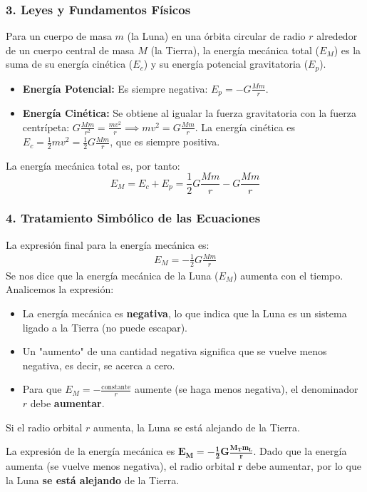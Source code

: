 \subsubsection*{3. Leyes y Fundamentos Físicos}
Para un cuerpo de masa $m$ (la Luna) en una órbita circular de radio $r$ alrededor de un cuerpo central de masa $M$ (la Tierra), la energía mecánica total ($E_M$) es la suma de su energía cinética ($E_c$) y su energía potencial gravitatoria ($E_p$).
\begin{itemize}
    \item \textbf{Energía Potencial:} Es siempre negativa: $E_p = -G\frac{Mm}{r}$.
    \item \textbf{Energía Cinética:} Se obtiene al igualar la fuerza gravitatoria con la fuerza centrípeta:
    $G\frac{Mm}{r^2} = \frac{mv^2}{r} \implies mv^2=G\frac{Mm}{r}$.
    La energía cinética es $E_c = \frac{1}{2}mv^2 = \frac{1}{2}G\frac{Mm}{r}$, que es siempre positiva.
\end{itemize}
La energía mecánica total es, por tanto:
$$ E_M = E_c + E_p = \frac{1}{2}G\frac{Mm}{r} - G\frac{Mm}{r} $$

\subsubsection*{4. Tratamiento Simbólico de las Ecuaciones}
La expresión final para la energía mecánica es:
\begin{gather}
    E_M = -\frac{1}{2}G\frac{Mm}{r}
\end{gather}
Se nos dice que la energía mecánica de la Luna ($E_M$) aumenta con el tiempo. Analicemos la expresión:
\begin{itemize}
    \item La energía mecánica es \textbf{negativa}, lo que indica que la Luna es un sistema ligado a la Tierra (no puede escapar).
    \item Un "aumento" de una cantidad negativa significa que se vuelve menos negativa, es decir, se acerca a cero.
    \item Para que $E_M = -\frac{\text{constante}}{r}$ aumente (se haga menos negativa), el denominador $r$ debe \textbf{aumentar}.
\end{itemize}
Si el radio orbital $r$ aumenta, la Luna se está alejando de la Tierra.

\begin{cajaresultado}
La expresión de la energía mecánica es $\boldsymbol{E_M = -\frac{1}{2}G\frac{M_T m_L}{r}}$. Dado que la energía aumenta (se vuelve menos negativa), el radio orbital $\boldsymbol{r}$ debe aumentar, por lo que la Luna \textbf{se está alejando} de la Tierra.
\end{cajaresultado}

